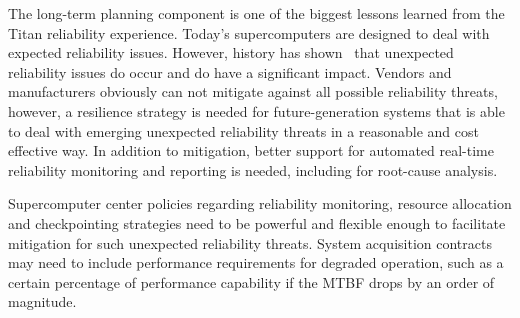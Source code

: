 The long-term planning component is one of the biggest lessons learned from the
Titan reliability experience. Today's supercomputers are designed to deal with
expected reliability issues. However, history has shown~\cite{geist12kill} that
unexpected reliability issues do occur and do have a significant impact. Vendors
and manufacturers obviously can not mitigate against all possible reliability
threats, however, a resilience strategy is needed for future-generation systems
that is able to deal with emerging unexpected reliability threats in a
reasonable and cost effective way. In addition to mitigation, better support for
automated real-time reliability monitoring and reporting is needed, including
for root-cause analysis.

Supercomputer center policies regarding reliability monitoring, resource
allocation and checkpointing strategies need to be powerful and flexible enough
to facilitate mitigation for such unexpected reliability threats. System
acquisition contracts may need to include performance requirements for degraded
operation, such as a certain percentage of performance capability if the MTBF
drops by an order of magnitude.

